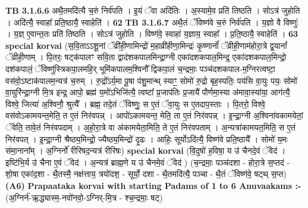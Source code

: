 \documentclass[17pt]{extarticle}
\begin{document}
{{                                \textbf{ TB 3.1.6.6} \newline
                  अथै॒तमदि॑त्यै च॒रुं निर्व॑पति । इ॒यं ॅवा अदि॑तिः । अ॒स्यामे॒व प्रति॑ तिष्ठति । सोऽत्र॑ जुहोति । अदि॑त्यै॒ स्वाहा᳚ प्रति॒ष्ठायै॒ स्वाहेति॑ । \textbf{ 62} \newline
                  \newline
                                \textbf{ TB 3.1.6.7} \newline
                  अथै॒तं ॅविष्ण॑वे च॒रुं निर्व॑पति । य॒ज्ञो वै विष्णुः॑ । य॒ज्ञ् ए॒वान्त॒तः प्रति॑ तिष्ठति । सोऽत्र॑ जुहोति । विष्ण॑वे॒ स्वाहा॑ य॒ज्ञाय॒ स्वाहा᳚ । प्र॒ति॒ष्ठायै॒ स्वाहेति॑ । \textbf{ 63} \newline
                  \newline
                                                        \textbf{special korvai} \newline
              (स॒वि॒ताऽऽशू॒नां ॅव्री॑ही॒णामिन्द्रो॑ म॒हाव्री॑हीणा॒मिन्द्रः॑ कृ॒ष्णानों᳚ ॅव्रीही॒णाम॑होरा॒त्रे द्व॒यानां᳚ ॅव्रीही॒णाम् । पि॒तरः॒ षट्क॑पालꣳ सवि॒ता द्वाद॑शकपालमिन्द्रा॒ग्नी एका॑दशकपाल॒मिन्द्र॒ एका॑दशकपाल॒मिन्द्रो॒ दश॑कपालं॒ ॅविष्णु॑स्त्रिकपा॒लमहि॒र् भूमि॑कपालम॒श्विनौ᳚ द्विकपा॒लं च॒न्द्रमाः॒ पञ्च॑दशकपाल-म॒ग्निरत्वष्टा॒ वस॑वो॒ऽष्टाक॑पालम॒न्यत्र॑ च॒रुम् । रु॒द्रो᳚ऽर्य॒मा पू॒षा प॑शु॒मान्थ् स्याꣳ॒॒ सोमो॑ रु॒द्रो बृह॒स्पतिः॒ पय॑सि वा॒युः पयः॒ सोमो॑ वा॒युरि॑न्द्रा॒ग्नी मि॒त्र इन्द्र॒ आपो॒ ब्रह्म॑ य॒मो॑ऽभिजि॑त्यै॒ त्वष्टा᳚ प्र॒जाप॑तिः प्र॒जायै॑ पौर्णमा॒स्या अ॑मावा॒स्या॑या॒ आग॑त्यै॒ विश्वे॒ जित्या॑ अ॒श्विनौ॒ श्रुत्यै᳚ । ब्रह्म॒ तदे॒तं ॅविष्णुः॒ स ए॒तं ॅवा॒युः स ए॒तदाप॒स्ताः । पि॒तरो॒ विश्वे॒ वस॑वोऽकामयन्त॒मेति॒ त ए॒तं निर॑वपन्न् । आपो॑ऽकामयन्त॒ मेति॒ ता ए॒तं निर॑वपन्न् । इ॒न्द्रा॒ग्नी अ॒श्विना॑वकामयेतां॒ ॅवेति॒ तावे॒तं निर॑वपदाम् । अ॒हो॒रा॒त्रे वा अ॑कामयेता॒मिति॒ ते ए॒तं निर॑वपताम् । अ॒न्यत्रा॑कामयत॒मिति॒ स ए॒तं निर॑वपत् । इ॒न्द्रा॒ग्नी श्रैष्ठ्य॒मिन्द्रो॒ ज्यैष्ठ्य॒मिन्द्रो॑ दृ॒ढः । आहिः॒ सूर्योऽदि॑त्यै॒ विष्ण॑वे प्रति॒ष्ठायै᳚ । सोमो॑ य॒मः स॑मा॒नाना᳚म् । अ॒ग्निर्नो॑ रीरिषद॒न्यत्र॑ रीरिषः) \newline
                            \textbf{special korvai} \newline
              (वि॒दुषो॑ ह॒विषा॒ य उ॑ चैनदे॒वं ॅवेद॑ । इष्टि॑भि॒र्य उ॑ चैना ए॒वं ॅवेद॑ । अ॒न्यत्र॑ ब्राह्म॒णे य उ॑ चैनमे॒वं ॅवेद॑ ) \newline
                                (च॒न्द्रमाः॒ पञ्च॑दशा - होरा॒त्रे स॒प्तद॑ - शो॒षा एका॑द॒शा - थै॒तस्मै॒ नक्ष॑त्ताय॒ त्रयो॑दश॒ - सूर्यो॒ दशा - थै॒तमदि॑त्यै॒ पञ्चा - थै॒तं ॅविष्ण॑वे॒ षट्थ् स॒प्त) \textbf{(A6)} \newline \newline
                \textbf{Prapaataka korvai with starting  Padams of 1 to 6 Anuvaakams :-} \newline
        (अ॒ग्निर्न॑-ऋ॒द्ध्यास्म॒-नवो॑नवो॒-ऽग्निर्-मि॒त्र - श्च॒न्द्रमाः॒ षट्) \newline

}}
\end{document}
